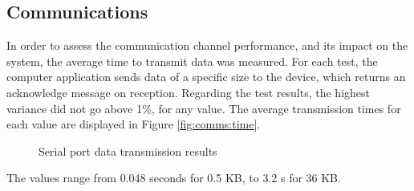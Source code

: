 \subsection{Communications}\label{chap:evaluation:performance:comms}

In order to assess the communication channel performance, and its impact on the system, the average time to transmit data was measured. For each test, the computer application sends data of a specific size to the device, which returns an acknowledge message on reception. Regarding the test results, the highest variance did not go above 1\%, for any value.
The average transmission times for each value are displayed in Figure \ref{fig:comms:time}.
\begin{figure}[h!]
	\centering     %
	\caption{Serial port data transmission results}
\end{figure}
The values range from 0.048 seconds for 0.5 KB, to 3.2 s for 36 KB.
